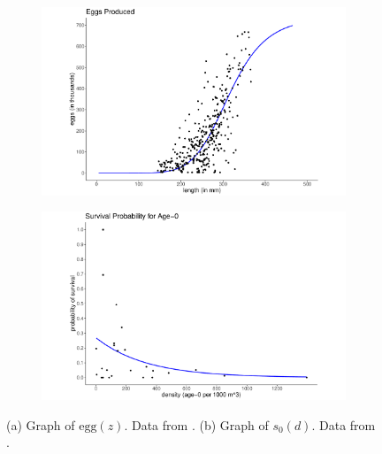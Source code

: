 \documentclass[preprint,review,12pt,authoryear]{elsarticle}
\begin{document}
\begin{figure}
\centering
\begin{subfigure}[b]{.43\textwidth}
  \includegraphics[width=\textwidth]{figures/Figure1a.pdf}
  \caption{}
  \label{fig:eggs}
\end{subfigure}
\begin{subfigure}[b]{.43\textwidth}
  \includegraphics[width=\textwidth]{figures/Figure1b.pdf}
  \caption{}
  \label{fig:surv_age0}
\end{subfigure}
\caption{(a) Graph of $\mbox{egg}(z)$. Data from \citep{jons1997ovarian}.  (b) Graph of $s_0(d)$. Data from \citep{michaletz2010overwinter}. }
\label{fig:fecundity}
\end{figure}    
%
\end{document}
